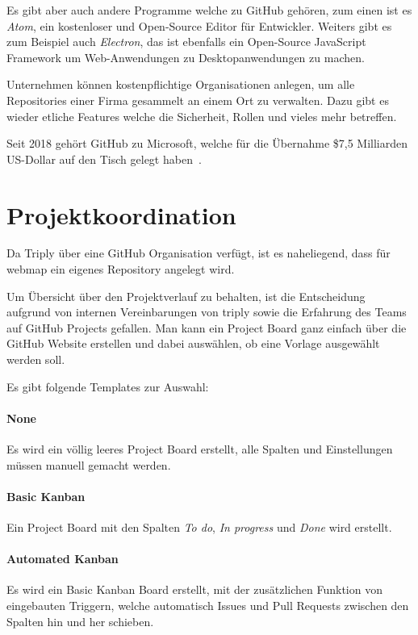 Es gibt aber auch andere Programme welche zu GitHub gehören, zum einen ist es \emph{Atom}, ein kostenloser und Open-Source Editor für Entwickler.
Weiters gibt es zum Beispiel auch \emph{Electron}, das ist ebenfalls ein Open-Source JavaScript Framework um Web-Anwendungen zu Desktopanwendungen zu machen.

Unternehmen können kostenpflichtige Organisationen anlegen, um alle Repositories einer Firma gesammelt an einem Ort zu verwalten.
Dazu gibt es wieder etliche Features welche die Sicherheit, Rollen und vieles mehr betreffen.

Seit 2018 gehört GitHub zu Microsoft, welche für die Übernahme \$7,5 Milliarden US-Dollar auf den Tisch gelegt haben~\cite{microsoft-acquires-github}.


\section{Projektkoordination}
Da Triply über eine GitHub Organisation verfügt, ist es naheliegend, dass für webmap ein eigenes Repository angelegt wird.

Um Übersicht über den Projektverlauf zu behalten, ist die Entscheidung aufgrund von internen Vereinbarungen von triply sowie die
Erfahrung des Teams auf GitHub Projects gefallen.
Man kann ein Project Board ganz einfach über die GitHub Website erstellen und dabei auswählen, ob eine Vorlage ausgewählt werden soll.

Es gibt folgende Templates zur Auswahl: ~\cite{github-create-project}

\paragraph{None}
Es wird ein völlig leeres Project Board erstellt, alle Spalten und Einstellungen müssen manuell gemacht werden.

\paragraph{Basic Kanban}
Ein Project Board mit den Spalten \emph{To do}, \emph{In progress} und \emph{Done} wird erstellt.

\paragraph{Automated Kanban}
Es wird ein Basic Kanban Board erstellt, mit der zusätzlichen Funktion von eingebauten Triggern, welche automatisch Issues
und Pull Requests zwischen den Spalten hin und her schieben.

